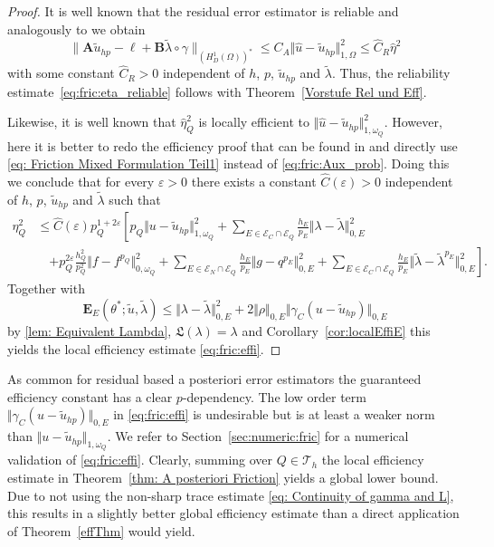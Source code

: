 \documentclass[12pt,twoside,reqno]{amsart}
\theoremstyle{definition}
\numberwithin{equation}{section}
\renewcommand{\L}{\mathfrak{L}}
\newcommand{\A} {\bm{A}}
\newcommand{\lin} {\bm{\ell}}
\newcommand{\B} {\bm{B}}
\newcommand  {\T}   {\mathscr T}
\newcommand{\norm}[1]    {\Vert #1 \Vert}
\begin{document}
\begin{proof}
It is well known that the residual error estimator is reliable and analogously to \cite{Melenk2001a} we obtain
 \begin{equation*}
   \|\A \tilde{u}_{hp} - \lin + \B \tilde{\lambda}  \circ \gamma \|_{(H^1_D(\Omega))^*} \leq C_A  \norm{\hat{u}-\tilde{u}_{hp}}_{1,\Omega}^2\leq \hat{C}_R\hat\eta^2
 \end{equation*}
with some constant $\hat{C}_R>0$ independent of $h$, $p$, $\tilde{u}_{hp}$ and $\tilde{\lambda}$. Thus, the reliability estimate~\eqref{eq:fric:eta_reliable} follows with Theorem~\ref{Vorstufe Rel und Eff}.

Likewise, it is well known that $\hat{\eta}^2_Q$ is locally efficient to $\norm{\hat{u}-\tilde{u}_{hp}}_{1,\omega_Q}^2$. However, here it is better to redo the efficiency proof that can be found in \cite{Melenk2001a} and directly use \eqref{eq: Friction Mixed Formulation Teil1} instead of \eqref{eq:fric:Aux_prob}. Doing this we conclude that for every $\varepsilon>0$ there exists a constant $\hat{C}(\varepsilon)>0$ independent of $h$, $p$, $\tilde{u}_{hp}$ and $\tilde{\lambda}$ such that
\begin{align*}
 \eta_Q^2   &\leq \hat{C}(\varepsilon) p_Q^{1+2\varepsilon}\left[ p_Q \norm{u-\tilde{u}_{hp}}^2_{1,\omega_Q} + \sum\limits_{E\in \mathcal{E}_C\cap\mathcal{E}_Q} \frac{h_E}{p_E}\norm{\lambda - \tilde{\lambda}}^2_{0,E} \right. \\
 & \quad \left.+ p_Q^{2\varepsilon} \frac{h_Q^2}{p_Q^2}\norm{f-f^{p_Q}}^2_{0,\omega_Q} + \sum\limits_{E\in \mathcal{E}_N\cap\mathcal{E}_Q} \frac{h_E}{p_E}\norm{g - q^{p_E}}^2_{0,E} + \sum\limits_{E\in \mathcal{E}_C\cap\mathcal{E}_Q} \frac{h_E}{p_E}\norm{\tilde{\lambda} - \tilde{\lambda}^{p_E}}^2_{0,E}    \right].
\end{align*}
Together with 
\begin{equation*}
    \bm{E}_E(\theta^*; \tilde{u},\tilde{\lambda})
     \leq \norm{\lambda-\tilde{\lambda}}_{0,E}^2 +2 \norm{\rho}_{0,E}\norm{\gamma_C(u-\tilde{u}_{hp})}_{0,E}
 \end{equation*}
 by \eqref{lem: Equivalent Lambda}, $\L(\lambda) =  \lambda$ and Corollary~\ref{cor:localEffiE} this yields the local efficiency estimate \eqref{eq:fric:effi}.    
\end{proof}

As common for residual based a posteriori error estimators the guaranteed efficiency constant has a clear $p$-dependency. The low order term $\norm{\gamma_C(u-\tilde{u}_{hp})}_{0,E}$ in \eqref{eq:fric:effi} is undesirable but  is at least a weaker norm than $\norm{u-\tilde{u}_{hp}}_{1,\omega_Q}$. 
 We refer to Section~\ref{sec:numeric:fric} for a numerical validation of \eqref{eq:fric:effi}.
Clearly, summing over $Q\in \T_h$ the local efficiency estimate in Theorem~\ref{thm: A posteriori Friction} yields a global lower bound. {Due to not using the non-sharp trace estimate \eqref{eq: Continuity of gamma and L}, this results in a slightly better global efficiency estimate than a direct application of Theorem~\ref{effThm} would yield.}
           
\end{document}

